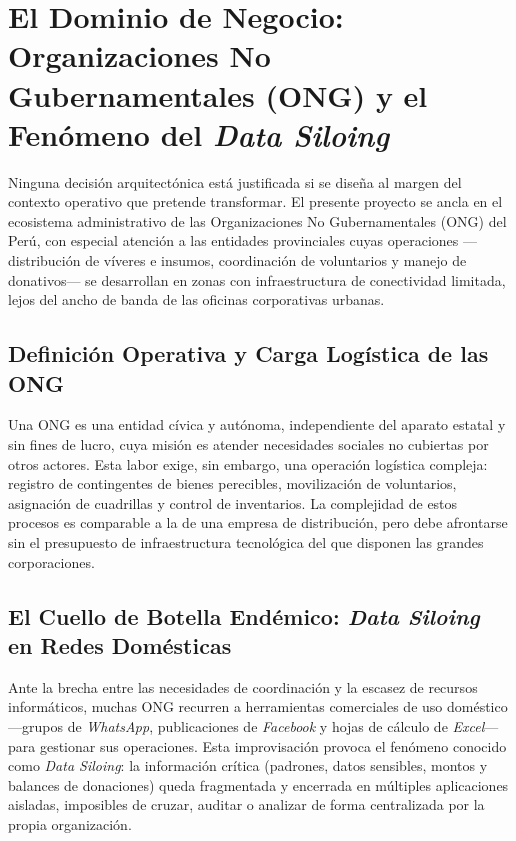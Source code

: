 \section{El Dominio de Negocio: Organizaciones No Gubernamentales (ONG) y el Fenómeno del \textit{Data Siloing}}

Ninguna decisión arquitectónica está justificada si se diseña al margen del contexto
operativo que pretende transformar. El presente proyecto se ancla en el ecosistema
administrativo de las Organizaciones No Gubernamentales (ONG) del Perú, con especial
atención a las entidades provinciales cuyas operaciones ---distribución de víveres e
insumos, coordinación de voluntarios y manejo de donativos--- se desarrollan en
zonas con infraestructura de conectividad limitada, lejos del ancho de banda de las
oficinas corporativas urbanas.

\subsection{Definición Operativa y Carga Logística de las ONG}

Una ONG es una entidad cívica y autónoma, independiente del aparato estatal y sin
fines de lucro, cuya misión es atender necesidades sociales no cubiertas por otros
actores. Esta labor exige, sin embargo, una operación logística compleja: registro
de contingentes de bienes perecibles, movilización de voluntarios, asignación de
cuadrillas y control de inventarios. La complejidad de estos procesos es comparable
a la de una empresa de distribución, pero debe afrontarse sin el presupuesto de
infraestructura tecnológica del que disponen las grandes corporaciones.

\subsection{El Cuello de Botella Endémico: \textit{Data Siloing} en Redes Domésticas}

Ante la brecha entre las necesidades de coordinación y la escasez de recursos
informáticos, muchas ONG recurren a herramientas comerciales de uso doméstico
---grupos de \textit{WhatsApp}, publicaciones de \textit{Facebook} y hojas de
cálculo de \textit{Excel}--- para gestionar sus operaciones. Esta improvisación
provoca el fenómeno conocido como \textit{Data Siloing}: la información crítica
(padrones, datos sensibles, montos y balances de donaciones) queda fragmentada y
encerrada en múltiples aplicaciones aisladas, imposibles de cruzar, auditar o
analizar de forma centralizada por la propia organización.

